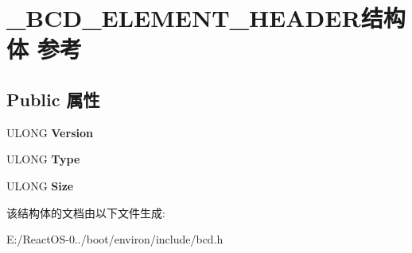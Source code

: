 \hypertarget{struct___b_c_d___e_l_e_m_e_n_t___h_e_a_d_e_r}{}\section{\+\_\+\+B\+C\+D\+\_\+\+E\+L\+E\+M\+E\+N\+T\+\_\+\+H\+E\+A\+D\+E\+R结构体 参考}
\label{struct___b_c_d___e_l_e_m_e_n_t___h_e_a_d_e_r}
\subsection*{Public 属性}
\begin{DoxyCompactItemize}
\item 
\mbox{\label{struct___b_c_d___e_l_e_m_e_n_t___h_e_a_d_e_r_a580d77b947b0bc6b5daa26e322d72227}} 
U\+L\+O\+NG {\bfseries Version}
\item 
\mbox{\label{struct___b_c_d___e_l_e_m_e_n_t___h_e_a_d_e_r_a6c499dd7efeb0325b10201b30e0fcb0c}} 
U\+L\+O\+NG {\bfseries Type}
\item 
\mbox{\label{struct___b_c_d___e_l_e_m_e_n_t___h_e_a_d_e_r_ab2efc74727edd24022f739238f5a0f02}} 
U\+L\+O\+NG {\bfseries Size}
\end{DoxyCompactItemize}


该结构体的文档由以下文件生成\+:\begin{DoxyCompactItemize}
\item 
E\+:/\+React\+O\+S-\/0../boot/environ/include/bcd.\+h\end{DoxyCompactItemize}
